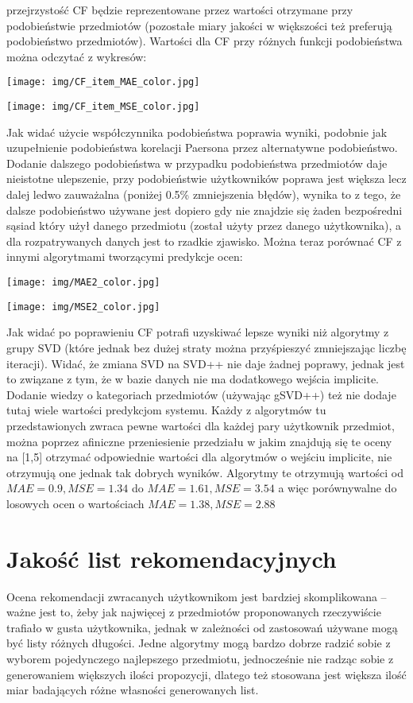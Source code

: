 \documentclass{pracamgr}
\begin{document}
   przejrzystość CF będzie reprezentowane przez wartości otrzymane przy podobieństwie przedmiotów
   (pozostałe miary jakości w większości też preferują podobieństwo przedmiotów).
   Wartości dla CF przy różnych funkcji podobieństwa można odczytać z wykresów:
   \begin{center}
    \texttt{[image: img/CF\_item\_MAE\_color.jpg]}
   \end{center}
   \begin{center}
    \texttt{[image: img/CF\_item\_MSE\_color.jpg]}
   \end{center}
   Jak widać użycie współczynnika podobieństwa poprawia wyniki, podobnie jak uzupełnienie podobieństwa korelacji Paersona przez alternatywne podobieństwo.
   Dodanie dalszego podobieństwa w przypadku podobieństwa przedmiotów daje nieistotne ulepszenie,
   przy podobieństwie użytkowników poprawa jest większa lecz dalej ledwo zauważalna (poniżej 0.5\% zmniejszenia błędów),
   wynika to z tego, że dalsze podobieństwo używane jest dopiero gdy nie znajdzie się żaden bezpośredni sąsiad 
   który użył danego przedmiotu (został użyty przez danego użytkownika), a dla rozpatrywanych danych jest to rzadkie zjawisko.
   Można teraz porównać CF z innymi algorytmami tworzącymi predykcje ocen:
   \begin{center}
    \texttt{[image: img/MAE2\_color.jpg]}
   \end{center}
   \begin{center}
    \texttt{[image: img/MSE2\_color.jpg]}
   \end{center}
   Jak widać po poprawieniu CF potrafi uzyskiwać lepsze wyniki niż algorytmy z grupy SVD
   (które jednak bez dużej straty można przyśpieszyć zmniejszając liczbę iteracji).
   Widać, że zmiana SVD na SVD++ nie daje żadnej poprawy, jednak jest to związane z tym, że w bazie danych nie ma dodatkowego wejścia implicite.
   Dodanie wiedzy o kategoriach przedmiotów (używając gSVD++) też nie dodaje tutaj wiele wartości predykcjom systemu.
   Każdy z algorytmów tu przedstawionych zwraca pewne wartości dla każdej pary użytkownik przedmiot, można poprzez afiniczne przeniesienie przedziału
   w jakim znajdują się te oceny na [1,5] otrzymać odpowiednie wartości dla algorytmów o wejściu implicite, nie otrzymują one jednak tak dobrych wyników.
   Algorytmy te otrzymują wartości od $MAE=0.9,MSE=1.34$ do $MAE=1.61,MSE=3.54$ a więc porównywalne do losowych ocen o
   wartościach $MAE=1.38,MSE=2.88$
  \section{Jakość list rekomendacyjnych}
   Ocena rekomendacji zwracanych użytkownikom jest bardziej skomplikowana -- ważne jest to, żeby jak najwięcej z przedmiotów proponowanych rzeczywiście trafiało
   w gusta użytkownika, jednak w zależności od zastosowań używane mogą być listy różnych długości.
   Jedne algorytmy mogą bardzo dobrze radzić sobie z wyborem pojedynczego najlepszego przedmiotu,
   jednocześnie nie radząc sobie z generowaniem większych ilości propozycji, dlatego też stosowana
   jest większa ilość miar badających różne własności generowanych list.
\end{document}
